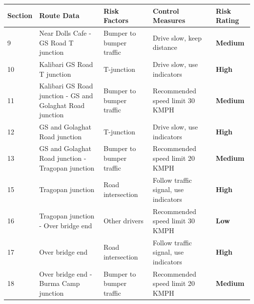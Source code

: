 \documentclass[paper=letter, fontsize=12pt]{article}
\begin{document}
\begin{tabular}{ |p{0.5cm}|p{2.5cm}|p{2cm}|p{3cm}|p{1cm}|  }
\hline
Section& Route Data &Risk Factors & Control Measures& Risk Rating \\
\hline

9 & Near Dolls Cafe - GS Road T junction & Bumper to bumper traffic & Drive slow, keep distance& \cellcolor[HTML]{FFCC00} \textbf{Medium}\\
\hline

10 & Kalibari GS Road T junction & T-junction & Drive slow, use indicators& \cellcolor[HTML]{FF0000} \textbf{High}\\
\hline

11 & Kalibari GS Road junction - GS and Golaghat Road junction& Bumper to bumper traffic& Recommended speed limit 30 KMPH& \cellcolor[HTML]{FFCC00} \textbf{Medium}\\
\hline

12 & GS and Golaghat Road junction & T-junction & Drive slow, use indicators& \cellcolor[HTML]{FF0000} \textbf{High}\\
\hline

13 & GS and Golaghat Road junction - Tragopan junction& Bumper to bumper traffic& Recommended speed limit 20 KMPH& \cellcolor[HTML]{FFCC00} \textbf{Medium}\\
\hline

15 & Tragopan junction & Road intersection & Follow traffic signal, use indicators& \cellcolor[HTML]{FF0000} \textbf{High}\\
\hline

16 & Tragopan junction - Over bridge end & Other drivers & Recommended speed limit 30 KMPH& \cellcolor[HTML]{00CC00} \textbf{Low}\\
\hline

17 & Over bridge end & Road intersection & Follow traffic signal, use indicators& \cellcolor[HTML]{FF0000} \textbf{High}\\
\hline

18 & Over bridge end - Burma Camp junction& Bumper to bumper traffic& Recommended speed limit 20 KMPH& \cellcolor[HTML]{FFCC00} \textbf{Medium}\\
\hline


\hline
\end{tabular}
\end{document}
